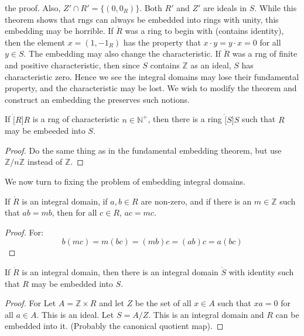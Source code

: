             the proof. Also, $Z'\cap{R}'=\{(0,0_{R})\}$. Both $R'$ and $Z'$
            are ideals in $S$. While this theorem shows that rngs can always
            be embedded into rings with unity, this embedding may be
            horrible. If $\ring{R}$ was a ring to begin with (contains
            identity), then the element $x=(1,\minus{1}_{R})$ has the
            property that $x\cdot{y}=y\cdot{x}=0$ for all $y\in{S}$. The
            embedding may also change the characteristic. If $\ring{R}$ was
            a rng of finite and positive characteristic, then since $S$
            contains $\mathbb{Z}$ as an ideal, $S$ has characteristic zero.
            Hence we see the integral domains may lose their fundamental
            property, and the characteristic may be lost. We wish to modify
            the theorem and construct an embedding the preserves such
            notions.
            \begin{theorem}
                If $\ring[R]{R}$ is a rng of characteristic
                $n\in\mathbb{N}^{+}$, then there is a ring $\ring[S]{S}$
                such that $R$ may be embeeded into $S$.
            \end{theorem}
            \begin{proof}
                Do the same thing as in the fundamental embedding theorem,
                but use $\mathbb{Z}/n\mathbb{Z}$ instead of $\mathbb{Z}$.
            \end{proof}
            We now turn to fixing the problem of embedding integral domains.
            \begin{theorem}
                If $\ring{R}$ is an integral domain, if $a,b\in{R}$ are
                non-zero, and if there is an $m\in\mathbb{Z}$ such that
                $ab=mb$, then for all $c\in{R}$, $ac=mc$.
            \end{theorem}
            \begin{proof}
                For:
                \begin{equation}
                    b(mc)=m(bc)=(mb)c=(ab)c=a(bc)
                \end{equation}
            \end{proof}
            \begin{theorem}
                If $\ring{R}$ is an integral domain, then there is an
                integral domain $\ring{S}$ with identity such that $R$
                may be embedded into $S$.
            \end{theorem}
            \begin{proof}
                For Let $A=\mathbb{Z}\times{R}$ and let $Z$ be the set of
                all $x\in{A}$ such that $xa=0$ for all $a\in{A}$. This is an
                ideal. Let $S=A/Z$. This is an integral domain and $R$ can
                be embedded into it. (Probably the canonical quotient map).
            \end{proof}
